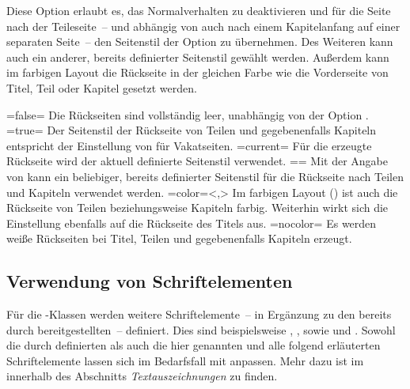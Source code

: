 \begin{DeclareEntity*}{}
\begin{DeclareEntity*}{}
\begin{DeclareEntity*}{}
\begin{Declaration}
Diese Option erlaubt es, das Normalverhalten zu deaktivieren und für die Seite 
nach der Teileseite~-- und abhängig von  auch nach einem 
Kapitelanfang auf einer separaten Seite~-- den Seitenstil der Option 
 zu übernehmen. Des Weiteren kann auch ein anderer, 
bereits definierter Seitenstil gewählt werden. Außerdem kann im farbigen Layout 
die Rückseite in der gleichen Farbe wie die Vorderseite von Titel, Teil oder 
Kapitel gesetzt werden. 
\begin{DeclareValues}
\itemval=false=
  Die Rückseiten sind vollständig leer, unabhängig von der Option
  .
\itemval*=true=
  Der Seitenstil der Rückseite von Teilen und gegebenenfalls Kapiteln entspricht
  der Einstellung von  für Vakatseiten.
\itemval=current=
  Für die erzeugte Rückseite wird der aktuell definierte Seitenstil verwendet.
\itemval==
  Mit der Angabe von  
  kann ein beliebiger, bereits definierter Seitenstil für die Rückseite nach 
  Teilen und Kapiteln verwendet werden.
\itemval=color=<,>
  Im farbigen Layout () ist auch die 
  Rückseite von Teilen beziehungsweise Kapiteln farbig. Weiterhin wirkt sich 
  die Einstellung ebenfalls auf die Rückseite des Titels aus.
\itemval=nocolor=
  Es werden weiße Rückseiten bei Titel, Teilen und gegebenenfalls Kapiteln 
  erzeugt.
\end{DeclareValues}
%
\end{Declaration}



\subsection{%
  Verwendung von Schriftelementen%
  \label{sec:fonts:elements}%
}
%
Für die \TUDScript-Klassen werden weitere Schriftelemente~-- in Ergänzung zu 
den bereits durch \KOMAScript bereitgestellten~-- definiert. Dies sind 
beispielsweise , ,  sowie 
 und . Sowohl die durch \KOMAScript 
definierten als auch die hier genannten und alle folgend erläuterten 
Schriftelemente lassen sich im Bedarfsfall mit 
 anpassen. 
Mehr dazu ist im \scrguide innerhalb des Abschnitts \emph{Textauszeichnungen} 
zu finden.


\end{DeclareEntity*}
\end{DeclareEntity*}
\end{DeclareEntity*}
